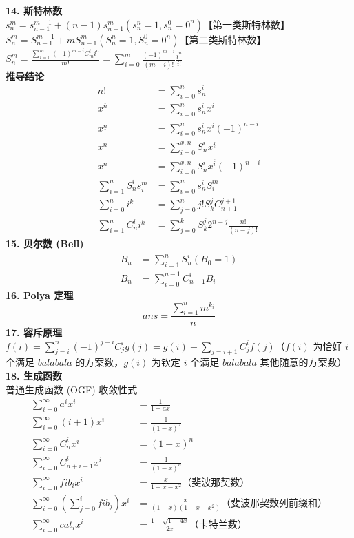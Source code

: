 \textbf{14. 斯特林数} \\
$s_{n}^{m}=s_{n-1}^{m-1}+(n-1)s_{n-1}^{m} (s_{n}^{n}=1,s_{n}^{0}=0^{n})$【第一类斯特林数】 \\
$S_{n}^{m}=S_{n-1}^{m-1}+mS_{n-1}^{m} (S_{n}^{n}=1,S_{n}^{0}=0^{n})$【第二类斯特林数】\\
$S_{n}^{m}=\frac{\sum_{i=0}^{m}(-1)^{m-i}C_{m}^{i}i^{n}}{m!}=\sum_{i=0}^{m} \frac{(-1)^{m-i}}{(m-i)!}\frac{i^{n}}{i !}$\\
\textbf{推导结论} 
$$
\begin{aligned}
n!&=\sum_{i=0}^{n}s_{n}^{i}\\
x^{\overline{n}}&=\sum_{i=0}^{n}s_{n}^{i}x^i\\
x^{\underline{n}}&=\sum_{i=0}^{n}s_{n}^{i}x^i(-1)^{n-i}\\
x^n&=\sum_{i=0}^{x,n}S_{n}^{i}x^{\underline{i}}\\
x^{n}&=\sum_{i=0}^{x,n}S_{n}^{i}x^{\overline{i}}(-1)^{n-i}\\
\sum_{i=1}^{n}S_{n}^{i}s_{i}^{m}&=\sum_{i=0}^{n}s_{n}^{i}S_{i}^{m}\\
\sum_{i=0}^{n} i^{k}&=\sum_{j=0}^{n}j!S_{k}^{j}C_{n+1}^{j+1}\\
\sum_{i=1}^{n}C_{n}^{i}i^{k}&=\sum_{j=0}^{k} S_{k}^{j}2^{n-j}\frac{n!}{(n-j)!} 
\end{aligned}
$$
\textbf{15. 贝尔数 (Bell)} 
$$
\begin{aligned}
    B_n&=\sum_{i=1}^{n}S_{n}^{i} (B_0=1) \\
    B_{n}&=\sum_{i=0}^{n-1}C_{n-1}^{i}B_{i}
\end{aligned}
$$
\textbf{16. Polya 定理} 
$$ans=\frac{\sum_{i=1}^{n}m^{k_{i}}}{n}$$
\textbf{17. 容斥原理} \\
$f(i)=\sum\limits_{j=i}^{n}(-1)^{j-i}C_{j}^{i}g(j) =g(i)-\sum\limits_{j=i+1}C_{j}^{i}f(j)$（$f(i)$ 为恰好 $i$ 个满足 $balabala$ 的方案数，$g(i)$ 为钦定 $i$ 个满足 $balabala$ 其他随意的方案数）\\
\textbf{18. 生成函数} \\
普通生成函数 (OGF) 收敛性式
$$
\begin{aligned}
    \sum_{i=0}^{\infty}a^ix^i&=\frac{1}{1-ax}\\
    \sum_{i=0}^{\infty}(i+1)x^i&=\frac{1}{(1-x)^2}\\
    \sum_{i=0}^{\infty}C_{n}^{i}x^i&=(1+x)^n\\
    \sum_{i=0}^{\infty}C_{n+i-1}^{i}x^i&=\frac{1}{(1-x)^n}\\
    \sum_{i=0}^{\infty}fib_{i}x^i&=\frac{x}{1-x-x^2}（斐波那契数）\\
    \sum_{i=0}^{\infty}(\sum_{j=0}^{i}fib_{j})x^i&=\frac{x}{(1-x)(1-x-x^2)}（斐波那契数列前缀和）\\
    \sum_{i=0}^{\infty}cat_{i}x^i&=\frac{1-\sqrt{1-4x}}{2x}（卡特兰数）
\end{aligned}
$$
